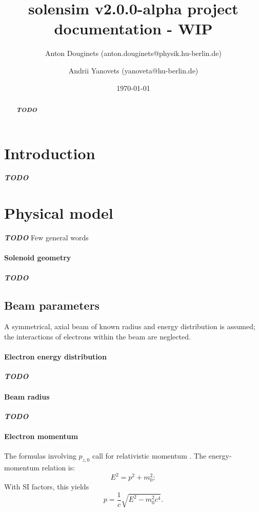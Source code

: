 \documentclass[a4paper,12pt]{article}
\title{solensim v2.0.0-alpha project documentation - WIP}
\author{Anton Douginets (anton.douginets@physik.hu-berlin.de)
	\and
	Andrii Yanovets (yanoveta@hu-berlin.de)}
\date{\today}
\newcommand{\todo}{\textbf{\textit{TODO}} }
\begin{document}
\thispagestyle{empty}
\maketitle

\begin{abstract}
  \todo
\end{abstract}

\tableofcontents

\newpage

\section{Introduction}
  \todo


\section{Physical model}
  \todo Few general words

  \paragraph{Solenoid geometry} \todo

  \subsection{Beam parameters}
    A symmetrical, axial beam of known radius and energy distribution is assumed; the interactions of electrons within the beam are neglected.
    \paragraph{Electron energy distribution}
    \todo \cite{AREALRF}

    \paragraph{Beam radius}
    \todo \cite{Disser}

    \paragraph{Electron momentum}
    The formulas involving $p_{z,0}$ call for relativistic momentum \cite[p. 27]{Disser}. The energy-momentum relation is:
    \[
      E^2 = p^2 + m_0^2;
    \]
      With SI factors, this yields
    \begin{equation}
	     p = \frac{1}{c}\sqrt{E^2 - m_0^2c^4}.
      \end{equation}
\end{document}
